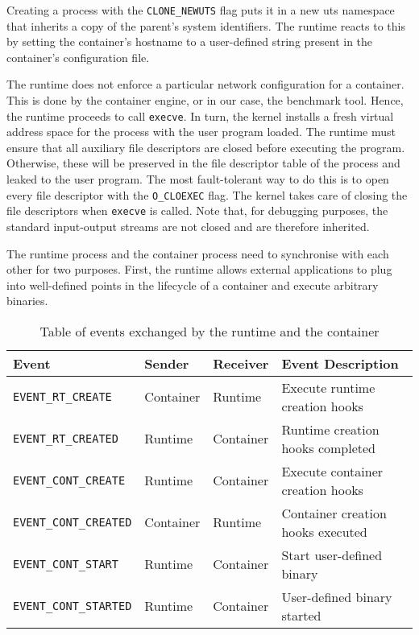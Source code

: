 Creating a process with the \verb|CLONE_NEWUTS| flag puts it in a new uts namespace that inherits 
a copy of the parent's system identifiers. The runtime reacts to this by setting the container's
hostname to a user-defined string present in the container's configuration file.

The runtime does not enforce a particular network configuration for a container. This is done 
by the container engine, or in our case, the benchmark tool. Hence, the runtime proceeds 
to call \verb|execve|. In turn, the kernel installs a fresh virtual address space 
for the process with the user program loaded. 
The runtime must ensure that all auxiliary file descriptors 
are closed before executing the program. Otherwise, these will be preserved in the file descriptor 
table of the process and leaked to the user program.
The most fault-tolerant way to do this is to open every file descriptor with the \verb|O_CLOEXEC|
flag. The kernel takes care of closing the file descriptors when \verb|execve| is called. 
Note that, for debugging purposes, the standard input-output streams are not closed and are 
therefore inherited. 

The runtime process and the container process need to synchronise with each other for two purposes.
First, the runtime allows external applications to plug into well-defined points in the 
lifecycle of a container and execute arbitrary binaries. 
\begin{table}[h!]
    \centering
    \begin{tabular}{ |m{4cm}|m{2cm}|m{2cm}|m{15em}| }
        \hline
        Event & Sender & Receiver & Event Description \\
        \hline
        \verb|EVENT_RT_CREATE| & Container & Runtime & Execute runtime creation hooks \\
        \hline
        \verb|EVENT_RT_CREATED| & Runtime & Container & Runtime creation hooks completed \\
        \hline 
        \verb|EVENT_CONT_CREATE| & Runtime & Container & Execute container creation hooks \\
        \hline 
        \verb|EVENT_CONT_CREATED| & Container & Runtime & Container creation hooks executed \\
        \hline
        \verb|EVENT_CONT_START| & Runtime & Container & Start user-defined binary \\
        \hline 
        \verb|EVENT_CONT_STARTED| & Runtime & Container & User-defined binary started \\
        \hline
    \end{tabular}
    \caption{Table of events exchanged by the runtime and the container}
    \label{table:implementation/runtime/socket-events}
\end{table}

